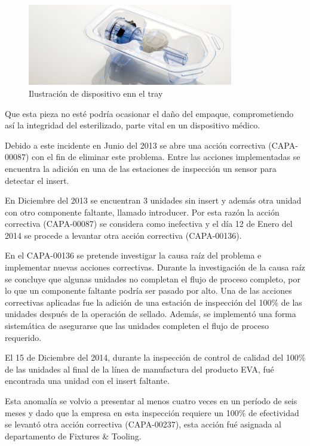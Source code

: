 \documentclass[12pt, twoside, letterpaper]{book}
\begin{document}
\begin{figure}[H]
\centering
\includegraphics[width=0.8\textwidth]{trayInsert}
\caption{Ilustraci\'on de dispositivo enn el tray}
\label{fig:insert}
\end{figure}

Que esta pieza no est\'e podr\'ia ocasionar el da\~no del empaque, comprometiendo as\'i la integridad del esterilizado, parte vital en un dispositivo m\'edico.

Debido a este incidente en Junio del 2013 se abre una acci\'on correctiva (CAPA-00087) con el fin de eliminar este problema. Entre las acciones implementadas se encuentra la adici\'on en una de las estaciones de inspecci\'on un sensor para detectar el insert.

En Diciembre del 2013 se encuentran 3 unidades sin insert y adem\'as otra unidad con otro componente faltante, llamado introducer. Por esta raz\'on la acci\'on correctiva (CAPA-00087) se considera como inefectiva y el d\'ia 12 de Enero del 2014 se procede a levantar otra acci\'on correctiva (CAPA-00136).

En el CAPA-00136 se pretende investigar la causa ra\'iz del problema e implementar nuevas
acciones correctivas. Durante la investigaci\'on de la causa ra\'iz se concluye que algunas
unidades no completan el flujo de proceso completo, por lo que un componente faltante
podr\'ia ser pasado por alto. Una de las acciones correctivas aplicadas fue la adici\'on de
una estaci\'on de inspecci\'on del 100\% de las unidades despu\'es de la operaci\'on de sellado. Adem\'as, se implement\'o una forma sistem\'atica de asegurarse que las unidades completen el flujo de proceso requerido.

El 15 de Diciembre del 2014, durante la inspecci\'on de control de calidad del 100\% de
las unidades al final de la l\'inea de manufactura del producto EVA, fu\'e encontrada una
unidad con el insert faltante.

Esta anomalía se volvio a presentar al menos cuatro veces en un per\'iodo de seis meses y dado que la empresa en esta inspecci\'on requiere un 100\% de efectividad se levant\'o otra acci\'on correctiva (CAPA-00237), esta acci\'on fu\'e asignada al departamento de Fixtures \& Tooling.
\end{document}
